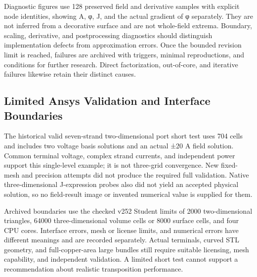 \documentclass[journal,10pt]{IEEEtran}
\begin{document}
Diagnostic figures use 128 preserved field and derivative samples with explicit node identities, showing A, φ, J, and the actual gradient of φ separately. They are not inferred from a decorative surface and are not whole-field extrema. Boundary, scaling, derivative, and postprocessing diagnostics should distinguish implementation defects from approximation errors. Once the bounded revision limit is reached, failures are archived with triggers, minimal reproductions, and conditions for further research. Direct factorization, out-of-core, and iterative failures likewise retain their distinct causes.


\subsection*{Limited Ansys Validation and Interface Boundaries}
\hypertarget{S2.ansys.heading}{}
The historical valid seven-strand two-dimensional port short test uses 704 cells and includes two voltage basis solutions and an actual ±20 A field solution. Common terminal voltage, complex strand currents, and independent power support this single-level example; it is not three-grid convergence. New fixed-mesh and precision attempts did not produce the required full validation. Native three-dimensional J-expression probes also did not yield an accepted physical solution, so no field-result image or invented numerical value is supplied for them.


Archived boundaries use the checked v252 Student limits of 2000 two-dimensional triangles, 64000 three-dimensional volume cells or 8000 surface cells, and four CPU cores. Interface errors, mesh or license limits, and numerical errors have different meanings and are recorded separately. Actual terminals, curved STL geometry, and full-copper-area large bundles still require suitable licensing, mesh capability, and independent validation. A limited short test cannot support a recommendation about realistic transposition performance.
\end{document}
